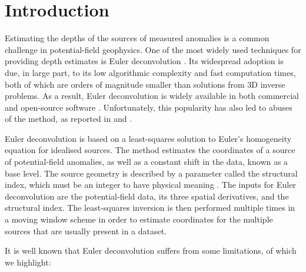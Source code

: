 \section{Introduction}

Estimating the depths of the sources of measured anomalies is a common challenge in potential-field geophysics.
One of the most widely used techniques for providing depth estimates is Euler deconvolution \citep{Thompson1982,Reid1990}.
Its widespread adoption is due, in large part, to its low algorithmic complexity and fast computation times, both of which are orders of magnitude smaller than solutions from 3D inverse problems.
As a result, Euler deconvolution is widely available in both commercial and open-source software \citep{Uieda2013,Uieda2014}.
Unfortunately, this popularity has also led to abuses of the method, as reported in \citet{Reid2014} and \citet{Reid2014b}.

Euler deconvolution is based on a least-squares solution to Euler's homogeneity equation for idealised sources.
The method estimates the coordinates of a source of potential-field anomalies, as well as a constant shift in the data, known as a base level.
The source geometry is described by a parameter called the structural index, which must be an integer to have physical meaning \citep{Stavrev2007,Reid2014}.
The inputs for Euler deconvolution are the potential-field data, its three spatial derivatives, and the structural index.
The least-squares inversion is then performed multiple times in a moving window scheme in order to estimate coordinates for the multiple sources that are usually present in a dataset.

It is well known that Euler deconvolution suffers from some limitations, of which we highlight:

